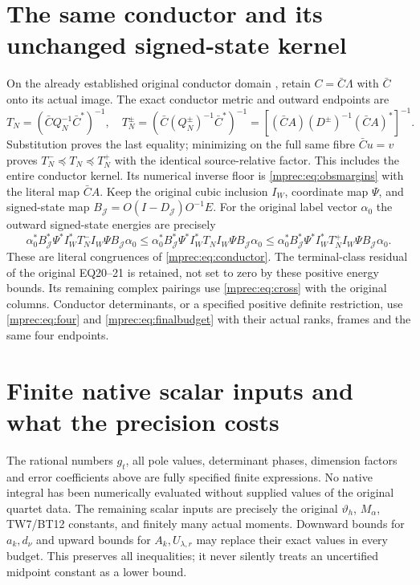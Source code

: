 \section{The same conductor and its unchanged signed-state kernel}

On the already established original conductor domain \cite{mprec:TR},
retain $C=\bar C\Lambda$ with $\bar C$ onto its actual image.
The exact conductor metric and outward endpoints are
\begin{equation}\label{mprec:eq:conductor}
 T_N=(\bar C Q_N^{-1}\bar C^*)^{-1},\quad
 T_N^\pm=(\bar C(Q_N^\pm)^{-1}\bar C^*)^{-1}
       =[(\bar CA)(D^\pm)^{-1}(\bar CA)^*]^{-1}.
\end{equation}
Substitution proves the last equality; minimizing on the full same
fibre $\bar Cu=v$ proves $T_N^-\preceq T_N\preceq T_N^+$
with the identical source-relative factor. This includes the entire
conductor kernel. Its numerical inverse floor is
\eqref{mprec:eq:obsmargins} with the literal map $\bar CA$.
Keep the original cubic inclusion $I_W$, coordinate map $\Psi$,
and signed-state map $B_{\mathcal J}=O(I-D_{\mathcal J})O^{-1}E$.
For the original label vector $\alpha_0$ the outward signed-state
energies are precisely
\[
 \alpha_0^*B_{\mathcal J}^*\Psi^*I_W^*T_N^-I_W\Psi
               B_{\mathcal J}\alpha_0
 \le\alpha_0^*B_{\mathcal J}^*\Psi^*I_W^*T_NI_W\Psi
               B_{\mathcal J}\alpha_0
 \le\alpha_0^*B_{\mathcal J}^*\Psi^*I_W^*T_N^+I_W\Psi
               B_{\mathcal J}\alpha_0.
\]
These are literal congruences of \eqref{mprec:eq:conductor}. The
terminal-class residual of the original EQ20--21 is retained,
not set to zero by these positive energy bounds. Its remaining
complex pairings use \eqref{mprec:eq:cross} with the original columns.
Conductor determinants, or a specified positive definite
restriction, use \eqref{mprec:eq:four} and \eqref{mprec:eq:finalbudget} with
their actual ranks, frames and the same four endpoints.

\section{Finite native scalar inputs and what the precision costs}

The rational numbers $g_t$, all pole values, determinant phases,
dimension factors and error coefficients above are fully specified
finite expressions. No native integral has been numerically
evaluated without supplied values of the original quartet data.
The remaining scalar inputs are precisely the original
$\vartheta_h$, $M_\alpha$, TW7/BT12 constants, and finitely many
actual moments. Downward bounds for $a_k,d_\nu$ and upward bounds
for $A_k,U_{\lambda,r}$ may replace their exact values in every
budget. This preserves all inequalities; it never silently treats
an uncertified midpoint constant as a lower bound.

